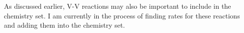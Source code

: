 \documentclass[11pt, oneside]{article}   	%
\newcommand{\todo}[1]{ \textcolor{red}{\bf{To Do:} #1}}
\newcommand{\future}[1]{ \textcolor{green}{\bf{Future Direction: #1}}}
\begin{document}
As discussed earlier, V-V reactions may also be important to include in the chemistry set.
I am currently in the process of finding rates for these reactions and adding them into the chemistry set.

%
%
%
\end{document}
